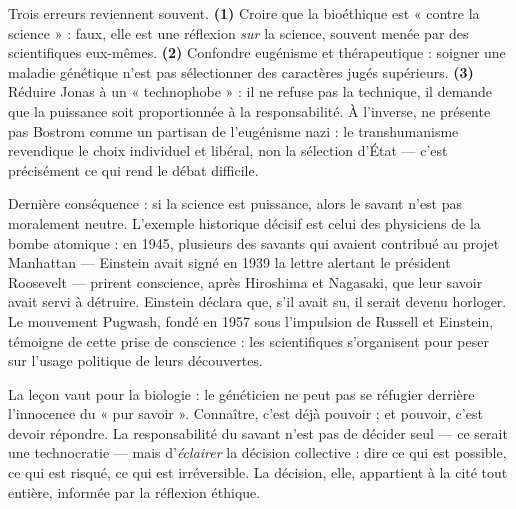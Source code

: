 \documentclass[11pt]{article}
\newcounter{popsec}
\newcounter{popsub}
\newcommand{\courssub}[1]{%
  \stepcounter{popsub}%
  \par\vspace{9pt}\noindent{\popxbold\fontsize{11.5}{13}\selectfont\color{popink}{\color{poporange}\thepopsec.\thepopsub}\hspace{6pt}#1}\par\nopagebreak\vspace{4pt}
}
\begin{document}
\begin{attention}
Trois erreurs reviennent souvent. \textbf{(1)} Croire que la bioéthique est « contre la science » : faux, elle est une réflexion \emph{sur} la science, souvent menée par des scientifiques eux-mêmes. \textbf{(2)} Confondre eugénisme et thérapeutique : soigner une maladie génétique n'est pas sélectionner des caractères jugés supérieurs. \textbf{(3)} Réduire Jonas à un « technophobe » : il ne refuse pas la technique, il demande que la puissance soit proportionnée à la responsabilité. À l'inverse, ne présente pas Bostrom comme un partisan de l'eugénisme nazi : le transhumanisme revendique le choix individuel et libéral, non la sélection d'État — c'est précisément ce qui rend le débat difficile.
\end{attention}

\courssub{La responsabilité du savant}

Dernière conséquence : si la science est puissance, alors le savant n'est pas moralement neutre. L'exemple historique décisif est celui des physiciens de la bombe atomique : en 1945, plusieurs des savants qui avaient contribué au projet Manhattan — Einstein avait signé en 1939 la lettre alertant le président Roosevelt — prirent conscience, après Hiroshima et Nagasaki, que leur savoir avait servi à détruire. Einstein déclara que, s'il avait su, il serait devenu horloger. Le mouvement Pugwash, fondé en 1957 sous l'impulsion de Russell et Einstein, témoigne de cette prise de conscience : les scientifiques s'organisent pour peser sur l'usage politique de leurs découvertes.

La leçon vaut pour la biologie : le généticien ne peut pas se réfugier derrière l'innocence du « pur savoir ». Connaître, c'est déjà pouvoir ; et pouvoir, c'est devoir répondre. La responsabilité du savant n'est pas de décider seul — ce serait une technocratie — mais d'\emph{éclairer} la décision collective : dire ce qui est possible, ce qui est risqué, ce qui est irréversible. La décision, elle, appartient à la cité tout entière, informée par la réflexion éthique.
\end{document}
